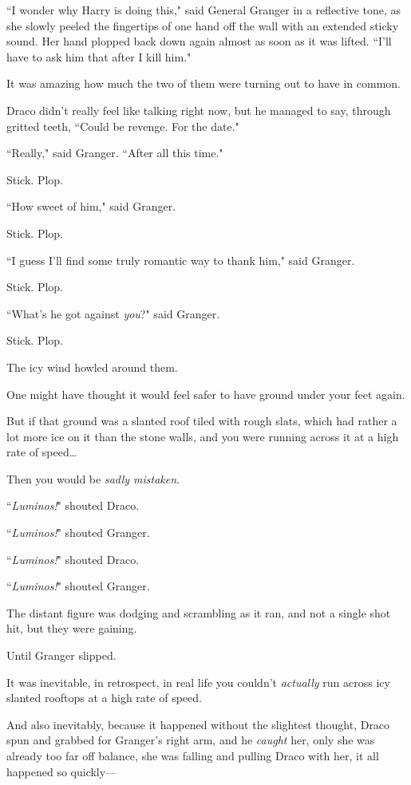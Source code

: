 ``I wonder why Harry is doing this," said General Granger in a reflective tone, as she slowly peeled the fingertips of one hand off the wall with an extended sticky sound. Her hand plopped back down again almost as soon as it was lifted. ``I'll have to ask him that after I kill him."

It was amazing how much the two of them were turning out to have in common.

Draco didn't really feel like talking right now, but he managed to say, through gritted teeth, ``Could be revenge. For the date."

``Really," said Granger. ``After all this time."

Stick. Plop.

``How sweet of him," said Granger.

Stick. Plop.

``I guess I'll find some truly romantic way to thank him," said Granger.

Stick. Plop.

``What's he got against \emph{you}?" said Granger.

Stick. Plop.

The icy wind howled around them.

\later

One might have thought it would feel safer to have ground under your feet again.

But if that ground was a slanted roof tiled with rough slats, which had rather a lot more ice on it than the stone walls, and you were running across it at a high rate of speed{\ldots}

Then you would be \emph{sadly mistaken}.

``\emph{Luminos!}" shouted Draco.

``\emph{Luminos!}" shouted Granger.

``\emph{Luminos!}" shouted Draco.

``\emph{Luminos!}" shouted Granger.

The distant figure was dodging and scrambling as it ran, and not a single shot hit, but they were gaining.

Until Granger slipped.

It was inevitable, in retrospect, in real life you couldn't \emph{actually} run across icy slanted rooftops at a high rate of speed.

And also inevitably, because it happened without the slightest thought, Draco spun and grabbed for Granger's right arm, and he \emph{caught} her, only she was already too far off balance, she was falling and pulling Draco with her, it all happened so quickly—

